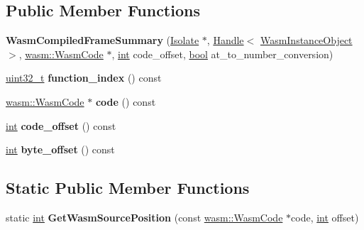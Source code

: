 \subsection*{Public Member Functions}
\begin{DoxyCompactItemize}
\item 
\mbox{\label{classv8_1_1internal_1_1FrameSummary_1_1WasmCompiledFrameSummary_a1375f04e1f49b734e45ca88067c13210}} 
{\bfseries Wasm\+Compiled\+Frame\+Summary} (\mbox{\hyperlink{classv8_1_1internal_1_1Isolate}{Isolate}} $\ast$, \mbox{\hyperlink{classv8_1_1internal_1_1Handle}{Handle}}$<$ \mbox{\hyperlink{classv8_1_1internal_1_1WasmInstanceObject}{Wasm\+Instance\+Object}} $>$, \mbox{\hyperlink{classv8_1_1internal_1_1wasm_1_1WasmCode}{wasm\+::\+Wasm\+Code}} $\ast$, \mbox{\hyperlink{classint}{int}} code\+\_\+offset, \mbox{\hyperlink{classbool}{bool}} at\+\_\+to\+\_\+number\+\_\+conversion)
\item 
\mbox{\label{classv8_1_1internal_1_1FrameSummary_1_1WasmCompiledFrameSummary_a406590c611b9813e44279db3c47325d5}} 
\mbox{\hyperlink{classuint32__t}{uint32\+\_\+t}} {\bfseries function\+\_\+index} () const
\item 
\mbox{\label{classv8_1_1internal_1_1FrameSummary_1_1WasmCompiledFrameSummary_a4c33f1ee196a755bfac86278f102abf3}} 
\mbox{\hyperlink{classv8_1_1internal_1_1wasm_1_1WasmCode}{wasm\+::\+Wasm\+Code}} $\ast$ {\bfseries code} () const
\item 
\mbox{\label{classv8_1_1internal_1_1FrameSummary_1_1WasmCompiledFrameSummary_a3b3f4e7b7e2336287bef2cf1995ceb36}} 
\mbox{\hyperlink{classint}{int}} {\bfseries code\+\_\+offset} () const
\item 
\mbox{\label{classv8_1_1internal_1_1FrameSummary_1_1WasmCompiledFrameSummary_a1529c5bca680d776ba313c257eab90ea}} 
\mbox{\hyperlink{classint}{int}} {\bfseries byte\+\_\+offset} () const
\end{DoxyCompactItemize}
\subsection*{Static Public Member Functions}
\begin{DoxyCompactItemize}
\item 
\mbox{\label{classv8_1_1internal_1_1FrameSummary_1_1WasmCompiledFrameSummary_a718046f93ba7f9d1f73e8a101d829cda}} 
static \mbox{\hyperlink{classint}{int}} {\bfseries Get\+Wasm\+Source\+Position} (const \mbox{\hyperlink{classv8_1_1internal_1_1wasm_1_1WasmCode}{wasm\+::\+Wasm\+Code}} $\ast$code, \mbox{\hyperlink{classint}{int}} offset)
\end{DoxyCompactItemize}
